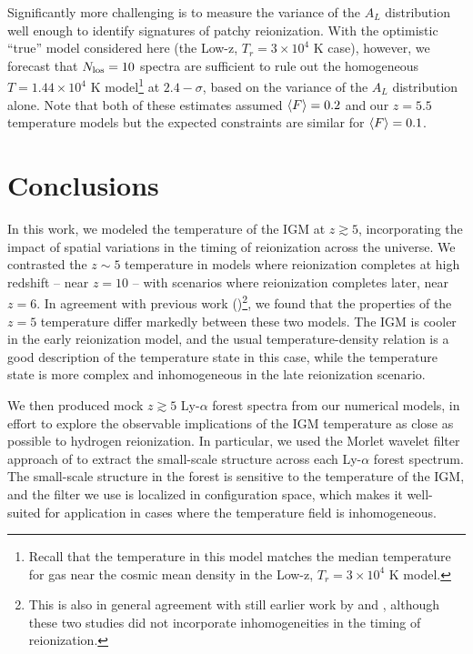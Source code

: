 Significantly more challenging is to measure the variance of the $A_L$ distribution well enough to identify signatures of patchy
reionization. With the optimistic ``true'' model considered here (the Low-z, $T_r=3 \times 10^4$ K case), however, we forecast that
$N_{\rm los}=10$ spectra are sufficient to rule out the homogeneous $T=1.44 \times 10^4$ K model\footnote{Recall that the temperature in this model matches the median temperature for gas near the cosmic mean density in the Low-z, $T_r=3 \times 10^4$ K model.} at $2.4-\sigma$, based on the variance of the $A_L$ distribution alone. Note that both of these estimates assumed $\langle F \rangle=0.2$ and our $z=5.5$ temperature models but the
expected constraints are similar for $\langle F \rangle=0.1$.

  

\section{Conclusions}
\label{sec:IGMTemperatureconclusions}

In this work, we modeled the temperature of the IGM at $z \gtrsim 5$, incorporating the impact of spatial
variations in the timing of reionization across the universe. We contrasted the $z \sim 5$ temperature in models
where reionization completes at high redshift -- near $z=10$ -- with scenarios where reionization completes
later, near $z = 6$. In agreement with previous work (\citealt{Trac:2008yz,Furlanetto:2009kr})\footnote{This is also
in general agreement with still earlier work by 
\citealt{Theuns:2002yc} and \citealt{Hui:2003hn}, although these two studies did not incorporate inhomogeneities in the
timing of reionization.}, we found
that the properties of the $z=5$ temperature differ markedly between these two models. The IGM is cooler in the
early reionization model, and the usual temperature-density relation is a good description of the temperature
state in this case, while the temperature state is more complex and inhomogeneous in the late reionization scenario.

We then produced mock $z \gtrsim 5$ Ly-$\alpha$ forest spectra from our numerical models, in effort to explore
the observable implications of the IGM temperature as close as possible to hydrogen reionization. In particular,
we used the Morlet wavelet filter approach of \citet{Lidz:2009ca} to extract the small-scale structure across
each Ly-$\alpha$ forest spectrum. The small-scale structure in the forest is sensitive to the temperature of the IGM,
and the filter we use is localized in configuration space, which makes it well-suited for application in cases
where the temperature field is inhomogeneous. 

